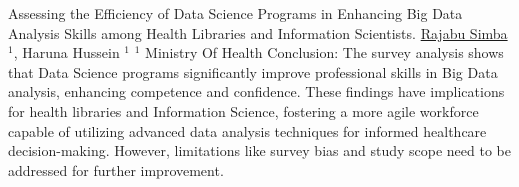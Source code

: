 \begin{abstract_online}{Assessing the Efficiency of Data Science Programs in Enhancing Big Data Analysis Skills among Health Libraries and Information Scientists.}{%
    \underline{Rajabu Simba}$^{1}$, Haruna Hussein $^{1}$}{%
    }{%
    $^1$ Ministry Of Health\newline{}
    }
Conclusion: The survey analysis shows that Data Science programs significantly improve professional skills in Big Data analysis, enhancing competence and confidence. These findings have implications for health libraries and Information Science, fostering a more agile workforce capable of utilizing advanced data analysis techniques for informed healthcare decision-making. However, limitations like survey bias and study scope need to be addressed for further improvement.

\end{abstract_online}

